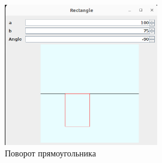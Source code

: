 \documentclass[a4paper, 14pt]{extarticle}
\begin{document}
\begin{figure}[!htb]
	\centering
	\includegraphics[width=0.6\textwidth]{output2.png}
\caption{Поворот прямоугольника}
\label{fig:output2}
\end{figure}
\end{document}
